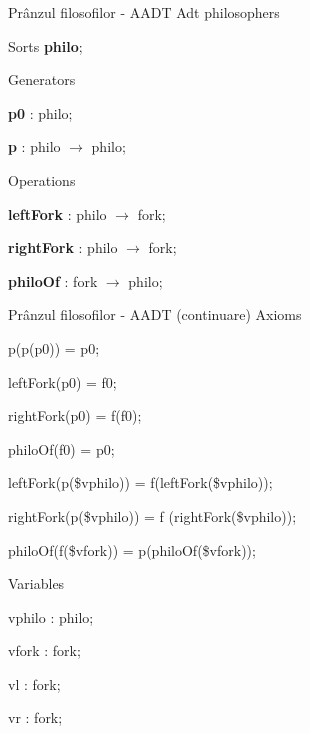 \documentclass{beamer}
\begin{document}
\begin{frame}{Prânzul filosofilor - AADT}
		Adt philosophers
		
		Sorts \textbf{philo};
		
		Generators
		
\hspace{0.5cm}			\textbf{p0} : philo;

\hspace{0.5cm}			\textbf{p}  : philo $\rightarrow$ philo;
			
		Operations
		
\hspace{0.5cm}			\textbf{leftFork} : philo $\rightarrow$ fork;
			
\hspace{0.5cm}			\textbf{rightFork} : philo $\rightarrow$ fork;
			
\hspace{0.5cm}			\textbf{philoOf} : fork $\rightarrow$ philo;
\end{frame}



\begin{frame}{Prânzul filosofilor - AADT (continuare)}
		Axioms
		
\hspace{0.5cm}			p(p(p0)) = p0;
			
\hspace{0.5cm}			leftFork(p0) = f0;
			
\hspace{0.5cm}			rightFork(p0) = f(f0);
			
\hspace{0.5cm}			philoOf(f0) = p0;
			
\hspace{0.5cm}			leftFork(p(\$vphilo)) = f(leftFork(\$vphilo));
			
\hspace{0.5cm}			rightFork(p(\$vphilo)) = f (rightFork(\$vphilo));
			
\hspace{0.5cm}			philoOf(f(\$vfork)) = p(philoOf(\$vfork));
			
		Variables
		
\hspace{0.5cm}			vphilo : philo;

\hspace{0.5cm}			vfork : fork;

\hspace{0.5cm}			vl : fork;

\hspace{0.5cm}			vr : fork;
\end{frame}
\end{document}
